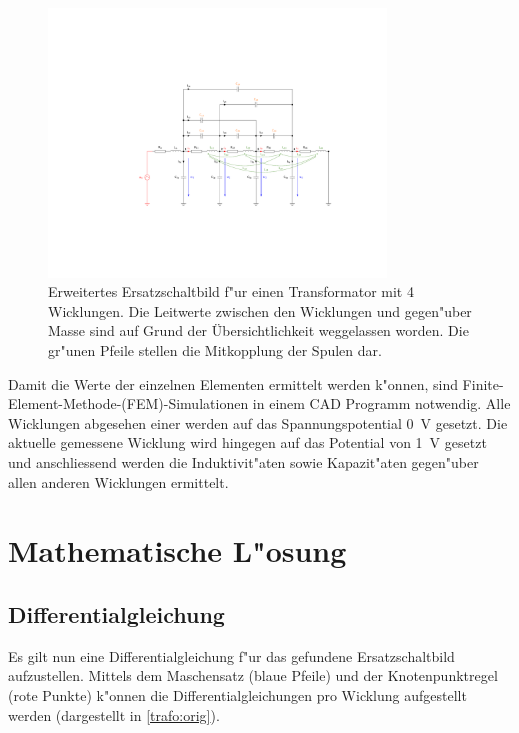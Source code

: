 \begin{refsection}
\begin{figure}
	\centering
	\includegraphics[width=0.8\textwidth]{trafo/Trafo_Modell.pdf}
	\caption[Erweitertes Ersatzschaltbild f"ur einen Transformator]{Erweitertes Ersatzschaltbild f"ur einen Transformator mit 4 Wicklungen. Die Leitwerte zwischen den Wicklungen und gegen"uber Masse sind auf Grund der Übersichtlichkeit weggelassen worden. Die gr"unen Pfeile stellen die Mitkopplung der Spulen dar. }
	\label{trafo:erweitertes_ESB}
\end{figure}

Damit die Werte der einzelnen Elementen ermittelt werden k"onnen, sind Finite-Element-Methode-(FEM)-Simulationen in einem CAD Programm notwendig. Alle Wicklungen abgesehen einer werden auf das Spannungspotential \SI{0}{\volt} gesetzt. Die aktuelle gemessene Wicklung wird hingegen auf das Potential von \SI{1}{\volt} gesetzt und anschliessend werden die Induktivit"aten sowie Kapazit"aten gegen"uber allen anderen Wicklungen ermittelt.


\section{Mathematische L"osung}
\subsection{Differentialgleichung}

Es gilt nun eine Differentialgleichung f"ur das gefundene Ersatzschaltbild aufzustellen. Mittels dem Maschensatz (blaue Pfeile) und der Knotenpunktregel (rote Punkte) k"onnen die Differentialgleichungen pro Wicklung aufgestellt werden (dargestellt in \ref{trafo:orig}).


\end{refsection}

